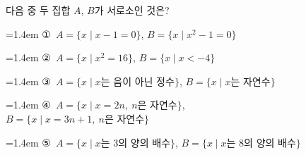 다음 중 두 집합 $A$, $B$가 서로소인 것은?
\par\medskip\par\noindent\hangindent=1.4em {\small ①}\ $A=\{x \mid x-1=0\}$, $B=\{x \mid x^2-1=0\}$\par\noindent\hangindent=1.4em {\small ②}\ $A=\{x \mid x^2=16\}$, $B=\{x \mid x<-4\}$\par\noindent\hangindent=1.4em {\small ③}\ $A=\{x \mid x$는 음이 아닌 정수$\}$, $B=\{x \mid x$는 자연수$\}$\par\noindent\hangindent=1.4em {\small ④}\ $A=\{x \mid x=2n,\ \mbox{$n$은 자연수}\}$,\\ $B=\{x \mid x=3n+1,\ \mbox{$n$은 자연수}\}$\par\noindent\hangindent=1.4em {\small ⑤}\ $A=\{x \mid x$는 $3$의 양의 배수$\}$, $B=\{x \mid x$는 $8$의 양의 배수$\}$\par\medskip
